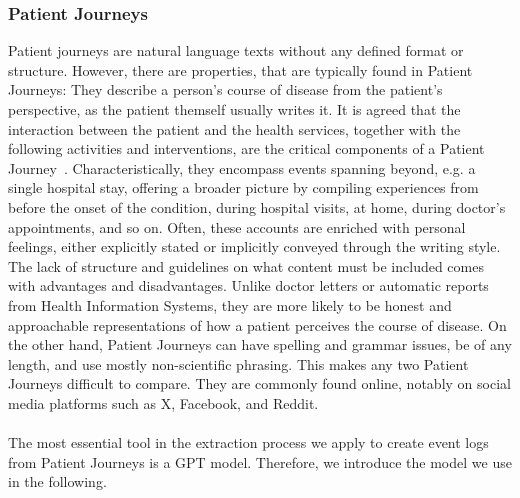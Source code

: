 \subsubsection*{Patient Journeys}\label{sec:pj}
Patient journeys are natural language texts without any defined format or structure. However, there are properties, that are typically found in Patient Journeys: They describe a person's course of disease from the patient's perspective, as the patient themself usually writes it. It is agreed that the interaction between the patient and the health services, together with the following activities and interventions, are the critical components of a Patient Journey~\cite{ferrara_engaging_2019, kuo_rosacea_2015}. Characteristically, they encompass events spanning beyond, e.g. a single hospital stay, offering a broader picture by compiling experiences from before the onset of the condition, during hospital visits, at home, during doctor's appointments, and so on. Often, these accounts are enriched with personal feelings, either explicitly stated or implicitly conveyed through the writing style. The lack of structure and guidelines on what content must be included comes with advantages and disadvantages. Unlike doctor letters or automatic reports from Health Information Systems, they are more likely to be honest and approachable representations of how a patient perceives the course of disease.
On the other hand, Patient Journeys can have spelling and grammar issues, be of any length, and use mostly non-scientific phrasing. This makes any two Patient Journeys difficult to compare. They are commonly found online, notably on social media platforms such as X, Facebook, and Reddit.\\\\
The most essential tool in the extraction process we apply to create event logs from Patient Journeys is a GPT model. Therefore, we introduce the model we use in the following.

